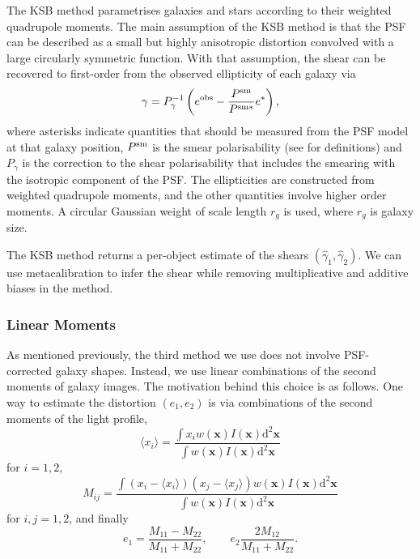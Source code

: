 \documentclass[iop]{emulateapj}
\begin{document}
The KSB method \citep{1995ApJ...449..460K} parametrises galaxies and
stars according to their weighted quadrupole moments.  The main
assumption of the KSB method is that the PSF can be described as a
small but highly anisotropic distortion convolved with a large
circularly symmetric function.  With that assumption, the shear can be
recovered to first-order from the observed ellipticity of each galaxy
via
\begin{equation} \label{eqn:weight}
\gamma=P_{\gamma}^{-1}\left(e^{\rm obs}-\frac{P^{\rm sm}}{P^{\rm sm*}}e^{*}\right),
\end{equation}
where asterisks indicate quantities that should be measured from the
PSF model at that galaxy position, $P^{\rm sm}$ is the smear
polarisability (see \citealt{2006MNRAS.368.1323H} for definitions) and
$P_\gamma$ is the correction to the shear polarisability that includes
the smearing with the isotropic component of the PSF. The
ellipticities are constructed from weighted quadrupole moments, and
the other quantities involve higher order moments. A circular Gaussian
weight of scale length $r_g$ is used, where $r_g$ is galaxy size.

The KSB method returns a per-object estimate of the shears
$(\hat{\gamma}_1, \hat{\gamma}_2)$. We can use metacalibration to
infer the shear while removing multiplicative and additive biases in
the method.

\subsubsection{Linear Moments}

As mentioned previously, the third method we use does not involve
PSF-corrected galaxy shapes.  Instead, we use linear combinations of
the second moments of galaxy images.  The motivation behind this
choice is as follows.  One way to estimate the distortion $(e_1,e_2)$
is via combinations of the second moments of the light profile,
\begin{equation}
\langle x_i\rangle = \frac{\int x_i w({\mathbf x}) I({\mathbf x}) \mathrm{d}^2{\mathbf x}}{\int w({\mathbf x}) I({\mathbf x}) \mathrm{d}^2{\mathbf x}}
\end{equation}
for $i=1, 2$,
\begin{equation}
M_{ij} = \frac{\int (x_i-\langle x_i\rangle)(x_j-\langle x_j\rangle) w({\mathbf x}) I({\mathbf x}) \mathrm{d}^2{\mathbf x}}{\int w({\mathbf x}) I({\mathbf x}) \mathrm{d}^2{\mathbf x}}
\end{equation}
for $i,j=1,2$, and finally 
\begin{equation}\label{eq:moments-div}
e_1 = \frac{M_{11}-M_{22}}{M_{11}+M_{22}}, \qquad e_2 \frac{2M_{12}}{M_{11}+M_{22}}.
\end{equation}
\end{document}
